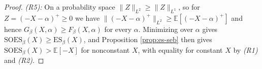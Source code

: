 \begin{proof}
\emph{(R5):} On a probability space $\|Z\|_{L^2} \geq \|Z\|_{L^1}$, so for $Z = (-X-\alpha)^{+} \geq 0$ we have
$\|(-X-\alpha)^{+}\|_{L^2} \geq \mathbb{E}[(-X-\alpha)^{+}]$ and hence $G_\beta(X, \alpha) \geq F_\beta(X, \alpha)$ for
every $\alpha$. Minimizing over $\alpha$ gives $\mathrm{SOES}_\beta(X) \geq \mathrm{ES}_\beta(X)$, and
Proposition \ref{prop:es-seb} then gives $\mathrm{SOES}_\beta(X) > \mathbb{E}[-X]$ for nonconstant $X$, with
equality for constant $X$ by \emph{(R1)} and \emph{(R2)}.
\end{proof}

